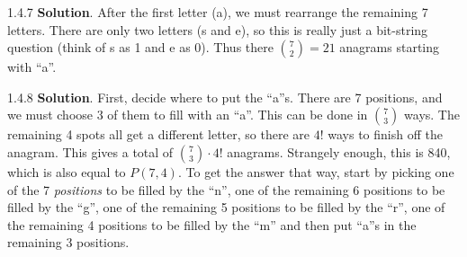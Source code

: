 \documentclass[11pt,]{book}
\theoremstyle{ptxplainnotitle}
\theoremstyle{ptxplaintitle}
\theoremstyle{ptxdefinitionnotitle}
\theoremstyle{ptxdefinitiontitle}
\theoremstyle{ptxdefinitionnotitle}
\theoremstyle{ptxdefinitiontitle}
\theoremstyle{ptxdefinitionnotitle}
\theoremstyle{ptxdefinitiontitle}
\theoremstyle{ptxdefinitiontitlenonumber}
\theoremstyle{ptxdefinitiontitlenonumber}
\numberwithin{equation}{chapter}
\begin{document}
\begin{divisionexercise}{1.4.7}
\textbf{Solution}.\quad%
\hypertarget{p-1657}{}%
After the first letter (a), we must rearrange the remaining 7 letters. There are only two letters (s and e), so this is really just a bit-string question (think of s as 1 and e as 0). Thus there \({7 \choose 2} = 21\) anagrams starting with ``a''.%
\end{divisionexercise}%
\begin{divisionexercise}{1.4.8}
\textbf{Solution}.\quad%
\hypertarget{p-1663}{}%
First, decide where to put the ``a''s. There are 7 positions, and we must choose 3 of them to fill with an ``a''. This can be done in \({7 \choose 3}\) ways. The remaining 4 spots all get a different letter, so there are \(4!\) ways to finish off the anagram. This gives a total of \({7 \choose 3}\cdot 4!\) anagrams. Strangely enough, this is 840, which is also equal to \(P(7,4)\text{.}\) To get the answer that way, start by picking one of the 7 \emph{positions} to be filled by the ``n'', one of the remaining 6 positions to be filled by the ``g'', one of the remaining 5 positions to be filled by the ``r'', one of the remaining 4 positions to be filled by the ``m'' and then put ``a''s in the remaining 3 positions.%
\end{divisionexercise}%
\end{document}
